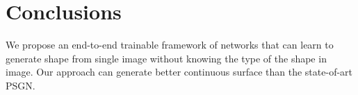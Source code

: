 \section{Conclusions}
We propose an end-to-end trainable framework of networks that can learn to generate shape from single image without knowing the type of the shape in image. Our approach can generate better continuous surface than the state-of-art PSGN\cite{PSGN}.